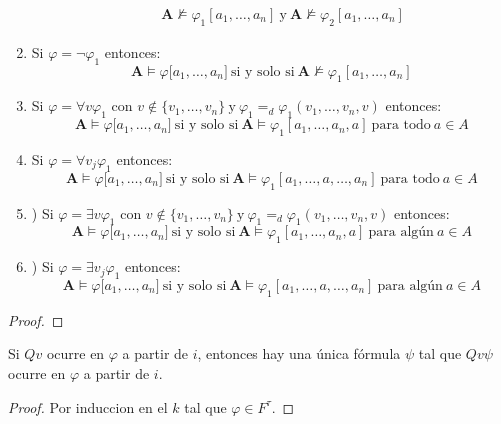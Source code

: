 \begin{lemma}
\begin{enumerate}
\begin{eqnarray*}
        && \mathbf{A} \not\models \varphi_{1}[a_{1}, \dotsc, a_{n}] \ \text{y} \ \mathbf{A} \not\models \varphi_{2}
        [a_{1}, \dotsc, a_{n}]
      \end{eqnarray*}
      \item Si $\varphi = \lnot \varphi_{1}$ entonces:
      \[
        \mathbf{A} \models \varphi \lbrack a_{1}, \dotsc, a_{n}] \ \text{si y solo si} \ \mathbf{A} \not\models
        \varphi_{1}[a_{1}, \dotsc, a_{n}]
      \]
      \item Si $\varphi = \forall v\varphi_{1}$ con $v\not\in \{v_{1}, \dotsc, v_{n}\} \ \text{y} \ \varphi_{1} =_{d}
      \varphi_{1}(v_{1}, \dotsc, v_{n}, v)$ entonces:
      \[
        \mathbf{A} \models \varphi \lbrack a_{1}, \dotsc, a_{n}] \ \text{si y solo si} \ \mathbf{A} \models \varphi_{1}
        [a_{1}, \dotsc, a_{n},a] \ \text{para todo} \ a \in A
      \]
      \item Si $\varphi = \forall v_{j}\varphi_{1}$ entonces:
      \[
        \mathbf{A} \models \varphi \lbrack a_{1}, \dotsc, a_{n}] \ \text{si y solo si} \ \mathbf{A} \models \varphi_{1}
        [a_{1}, \dotsc, a, \dotsc, a_{n}] \ \text{para todo} \ a \in A
      \]
      \item) Si $\varphi = \exists v\varphi_{1}$ con $v\not\in \{v_{1}, \dotsc, v_{n}\} \ \text{y} \ \varphi_{1} =_{d}
      \varphi_{1}(v_{1}, \dotsc, v_{n}, v)$ entonces:
      \[
        \mathbf{A} \models \varphi \lbrack a_{1}, \dotsc, a_{n}] \ \text{si y solo si} \ \mathbf{A} \models \varphi_{1}
        [a_{1}, \dotsc, a_{n}, a] \ \text{para algún} \ a \in A
      \]
      \item) Si $\varphi = \exists v_{j}\varphi_{1}$ entonces:
      \[
        \mathbf{A} \models \varphi \lbrack a_{1}, \dotsc, a_{n}] \ \text{si y solo si} \ \mathbf{A} \models \varphi_{1}
        [a_{1}, \dotsc, a, \dotsc, a_{n}] \ \text{para algún} \ a \in A
      \]
    \end{enumerate}
  \end{lemma}
  \begin{proof}
  \end{proof}

  \begin{lemma} \label{lemma_63}
    \PN Si $Qv$ ocurre en $\varphi$ a partir de $i$, entonces hay una única fórmula $\psi$ tal que $Qv\psi$ ocurre en
    $\varphi$ a partir de $i$.
  \end{lemma}
  \begin{proof}
    Por induccion en el $k$ tal que $\varphi \in F^{\tau}$.
  \end{proof}

